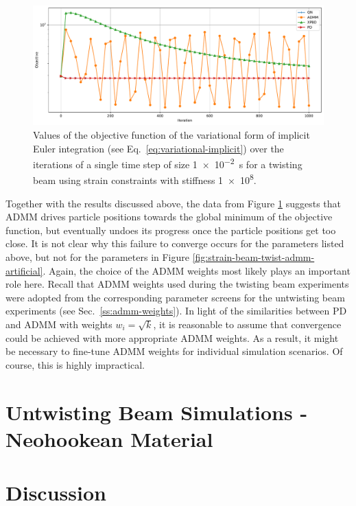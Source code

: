 \begin{figure}[h]
    \includegraphics[width=\textwidth]{figures/strain_beam_twist_objectives_admm_failure.pdf}
    \caption{Values of the objective function of the variational form of implicit Euler integration (see Eq.\ \ref{eq:variational-implicit}) over the iterations of 
        a single time step of size \SI{1e-2}{\second} for a twisting beam using strain constraints with stiffness \num{1e8}.}
    \label{fig:strain-beam-twist-objectives-admm-failure}
\end{figure}

Together with the results discussed above, the data from Figure \ref{fig:strain-beam-twist-objectives-admm-failure} suggests that ADMM drives particle 
positions towards the global minimum of the objective function, but eventually undoes its progress once the particle positions get too close. It is not clear why 
this failure to converge occurs for the parameters listed above, but not for the parameters in Figure \ref{fig:strain-beam-twist-admm-artificial}. Again, the choice 
of the ADMM weights most likely plays an important role here. Recall that ADMM weights used during the twisting beam experiments were adopted from the corresponding 
parameter screens for the untwisting beam experiments (see Sec.\ \ref{ss:admm-weights}). In light of the similarities between PD and ADMM with weights $w_i = \sqrt{k}$, 
it is reasonable to assume that convergence could be achieved with more appropriate ADMM weights. As a result, it might be necessary to fine-tune ADMM weights for 
individual simulation scenarios. Of course, this is highly impractical.

\section{Untwisting Beam Simulations - Neohookean Material}\label{ss:untwisting-beam-neohookean}

\section{Discussion}\label{s:discussion}

